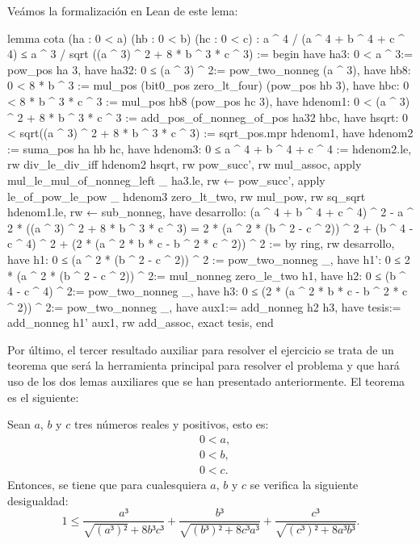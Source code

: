 Veámos la formalización en Lean de este lema:

\begin{leancode}
lemma cota (ha : 0 < a) (hb : 0 < b) (hc : 0 < c) :
  a ^ 4 / (a ^ 4 + b ^ 4 + c ^ 4) ≤
  a ^ 3 / sqrt ((a ^ 3) ^ 2 + 8 * b ^ 3 * c ^ 3) :=
begin
  have ha3: 0 < a ^ 3:= pow_pos ha 3,
  have ha32: 0 ≤  (a ^ 3) ^ 2:= pow_two_nonneg (a ^ 3),
  have hb8: 0 < 8 * b ^ 3 := mul_pos (bit0_pos zero_lt_four) (pow_pos hb 3),
  have hbc: 0 < 8 * b ^ 3 * c ^ 3 := mul_pos hb8 (pow_pos hc 3),
  have hdenom1: 0 < (a ^ 3) ^ 2 + 8 * b ^ 3 * c ^ 3 := 
    add_pos_of_nonneg_of_pos ha32 hbc,
  have hsqrt: 0 < sqrt((a ^ 3) ^ 2 + 8 * b ^ 3 * c ^ 3) := 
    sqrt_pos.mpr hdenom1,
  have hdenom2 := suma_pos ha hb hc,
  have hdenom3: 0 ≤ a ^ 4 + b ^ 4 + c ^ 4 := hdenom2.le,
  rw div_le_div_iff hdenom2 hsqrt,
  rw pow_succ',
  rw mul_assoc,
  apply mul_le_mul_of_nonneg_left _ ha3.le,
  rw ← pow_succ',
  apply le_of_pow_le_pow _ hdenom3 zero_lt_two,
  rw mul_pow,
  rw sq_sqrt hdenom1.le,
  rw ← sub_nonneg,
  have desarrollo: (a ^ 4 + b ^ 4 + c ^ 4) ^ 2 - 
      a ^ 2 * ((a ^ 3) ^ 2 + 8 * b ^ 3 * c ^ 3)
      = 2 * (a ^ 2 * (b ^ 2 - c ^ 2)) ^ 2 + (b ^ 4 - c ^ 4) ^ 2 +
      (2 * (a ^ 2 * b * c - b ^ 2 * c ^ 2)) ^ 2 := by ring,
  rw desarrollo,
  have h1: 0 ≤ (a ^ 2 * (b ^ 2 - c ^ 2)) ^ 2 := pow_two_nonneg _,
  have h1': 0 ≤ 2 * (a ^ 2 * (b ^ 2 - c ^ 2)) ^ 2:= 
    mul_nonneg zero_le_two h1,
  have h2: 0 ≤ (b ^ 4 - c ^ 4) ^ 2:= pow_two_nonneg _,
  have h3: 0 ≤ (2 * (a ^ 2 * b * c - b ^ 2 * c ^ 2)) ^ 2:= 
    pow_two_nonneg _,
  have aux1:= add_nonneg h2 h3,
  have tesis:= add_nonneg h1' aux1,
  rw add_assoc,
  exact tesis,
end
\end{leancode}

Por último, el tercer resultado auxiliar para resolver el ejercicio
se trata de un teorema que será la herramienta principal para
resolver el problema y que hará uso de los dos lemas auxiliares
que se han presentado anteriormente. El teorema es el siguiente:
\begin{teorema}
  Sean \(a\), \(b\) y \(c\) tres números reales y positivos, esto es:
  \begin{align}
    &0<a, \label{haq2t}\tag{ha}\\
    &0<b, \label{hbq2t}\tag{hb}\\
    &0<c. \label{hcq2t}\tag{hc}
  \end{align}
  Entonces, se tiene que para cualesquiera \(a\), \(b\) y \(c\) se
  verifica la siguiente desigualdad:
  \begin{equation}
    1≤\frac{a³}{\sqrt{(a³)²}+8b³c³}+\frac{b³}{\sqrt{(b³)²+8c³a³}}+
    \frac{c³}{\sqrt{(c³)²+8a³b³}}.
  \end{equation}
\end{teorema}

